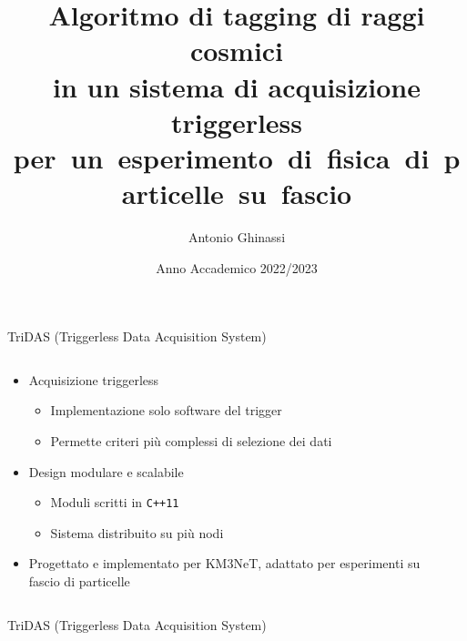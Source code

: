 \documentclass[aspectratio=169]{beamer}
\title{Algoritmo di tagging di raggi cosmici\\in un sistema di acquisizione triggerless\\\mbox{per un esperimento di fisica di particelle su fascio}}
\date{Anno Accademico 2022/2023}
\author{Antonio Ghinassi}
\institute{Corso di Laurea in Fisica $\cdot$ Università di Bologna}
\begin{document}
  \maketitle
  \begin{frame}{TriDAS (Triggerless Data Acquisition System)}
      \begin{columns}[onlytextwidth,T]
      \begin{column}{.45\linewidth}
      \begin{itemize}
         \item Acquisizione triggerless
             \begin{itemize}
                \item Implementazione solo software del trigger
                \item Permette criteri più complessi di selezione dei dati
             \end{itemize}
         \item Design modulare e scalabile
             \begin{itemize}
                 \item Moduli scritti in \texttt{C++11}
                 \item Sistema distribuito su più nodi 
             \end{itemize}
         \item Progettato e implementato per KM3NeT, adattato per esperimenti su fascio di particelle
      \end{itemize}
      \end{column}
      \begin{column}{.45\linewidth}
      \end{column}
    \end{columns}
  \end{frame}
  \begin{frame}{TriDAS (Triggerless Data Acquisition System)}
  \end{frame}
\end{document}
